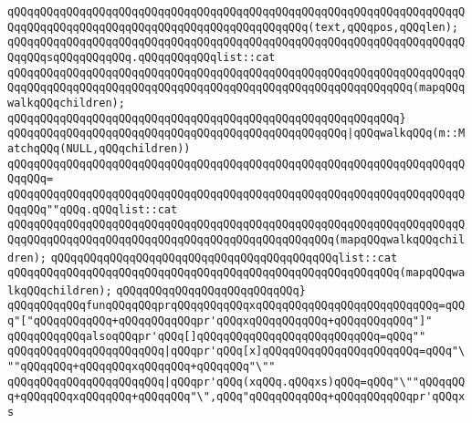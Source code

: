 \verb|qQQqqQQqqQQqqQQqqQQqqQQqqQQqqQQqqQQqqQQqqQQqqQQqqQQqqQQqqQQqqQQqqQQqqQQqqQQqqQQqqQQqqQQqqQQqqQQqqQQqqQQqqQQqqQQqqQQq(text,qQQqpos,qQQqlen);|\newline
\newline
\verb|qQQqqQQqqQQqqQQqqQQqqQQqqQQqqQQqqQQqqQQqqQQqqQQqqQQqqQQqqQQqqQQqqQQqqQQqqQQqsqQQqqQQqqQQq.qQQqqQQqqQQqlist::cat|\newline
\verb|qQQqqQQqqQQqqQQqqQQqqQQqqQQqqQQqqQQqqQQqqQQqqQQqqQQqqQQqqQQqqQQqqQQqqQQqqQQqqQQqqQQqqQQqqQQqqQQqqQQqqQQqqQQqqQQqqQQqqQQqqQQqqQQqqQQq(mapqQQqwalkqQQqchildren);|\newline
\verb|qQQqqQQqqQQqqQQqqQQqqQQqqQQqqQQqqQQqqQQqqQQqqQQqqQQqqQQqqQQq}|\newline
\newline
\verb|qQQqqQQqqQQqqQQqqQQqqQQqqQQqqQQqqQQqqQQqqQQqqQQqqQQq|\verb#|qQQqwalkqQQq(m::MatchqQQq(NULL,qQQqchildren))#\newline
\verb|qQQqqQQqqQQqqQQqqQQqqQQqqQQqqQQqqQQqqQQqqQQqqQQqqQQqqQQqqQQqqQQqqQQqqQQqqQQq=|\newline
\verb|qQQqqQQqqQQqqQQqqQQqqQQqqQQqqQQqqQQqqQQqqQQqqQQqqQQqqQQqqQQqqQQqqQQqqQQqqQQq""qQQq.qQQqlist::cat|\newline
\verb|qQQqqQQqqQQqqQQqqQQqqQQqqQQqqQQqqQQqqQQqqQQqqQQqqQQqqQQqqQQqqQQqqQQqqQQqqQQqqQQqqQQqqQQqqQQqqQQqqQQqqQQqqQQqqQQqqQQqqQQq(mapqQQqwalkqQQqchildren);|\newline
\newline
\verb|qQQqqQQqqQQqqQQqqQQqqQQqqQQqqQQqqQQqqQQqqQQqlist::cat|\newline
\verb|qQQqqQQqqQQqqQQqqQQqqQQqqQQqqQQqqQQqqQQqqQQqqQQqqQQqqQQqqQQq(mapqQQqwalkqQQqchildren);|\newline
\verb|qQQqqQQqqQQqqQQqqQQqqQQqqQQq}|\newline
\newline
\newline
\verb|qQQqqQQqqQQqfunqQQqqQQqprqQQqqQQqqQQqxqQQqqQQqqQQqqQQqqQQqqQQqqQQq=qQQq"["qQQqqQQqqQQq+qQQqqQQqqQQqpr'qQQqxqQQqqQQqqQQq+qQQqqQQqqQQq"]"|\newline
\newline
\verb|qQQqqQQqqQQqalsoqQQqpr'qQQq[]qQQqqQQqqQQqqQQqqQQqqQQqqQQq=qQQq""|\newline
\verb|qQQqqQQqqQQqqQQqqQQqqQQq|\verb#|qQQqpr'qQQq[x]qQQqqQQqqQQqqQQqqQQqqQQq=qQQq"\""qQQqqQQq+qQQqqQQqxqQQqqQQq+qQQqqQQq"\""#\newline
\verb|qQQqqQQqqQQqqQQqqQQqqQQq|\verb#|qQQqpr'qQQq(xqQQq.qQQqxs)qQQq=qQQq"\""qQQqqQQq+qQQqqQQqxqQQqqQQq+qQQqqQQq"\",qQQq"qQQqqQQqqQQq+qQQqqQQqqQQqpr'qQQqxs#\newline
